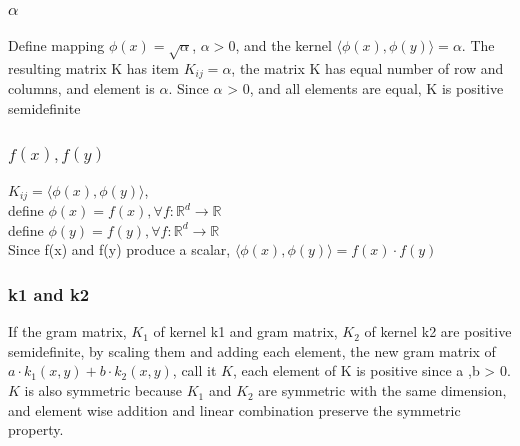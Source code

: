 \documentclass[letterpaper, 12]{article}
\begin{document}
\subsubsection{$\alpha$}
Define mapping $\phi (x) = \sqrt{\alpha}$, $\alpha > 0$, and the kernel $\langle \phi(x), \phi(y) \rangle = \alpha$.
The resulting matrix K has item $K_{ij} = \alpha $, the matrix K has equal number of row and columns, and element is $\alpha$. Since $\alpha$ > 0, and all elements are equal, K is positive semidefinite
 
\subsubsection{$f(x), f(y)$}
$K_{ij} = \langle \phi (x),  \phi (y) \rangle$, \\
define $\phi(x) = f(x), \forall f: \mathbb{R}^{d} \rightarrow \mathbb{R}$\\
define $\phi(y) = f(y), \forall f: \mathbb{R}^{d} \rightarrow \mathbb{R}$\\
Since f(x) and f(y) produce a scalar,  $\langle \phi (x),  \phi (y) \rangle = f(x) \cdot f(y)$

\subsubsection{k1 and k2}
If the gram matrix, $K_{1}$ of kernel k1 and gram matrix, $K_{2}$ of kernel k2 are positive semidefinite, by scaling them and adding each element, the new gram matrix of $a \cdot k_{1}(x, y) + b \cdot k_{2}(x, y)$, call it $K$, each element of K is positive since a ,b > 0.\\
$K$ is also symmetric because $K_{1}$ and $K_{2}$ are symmetric with the same dimension, and element wise addition and linear combination preserve the symmetric property.\\

\end{document}
